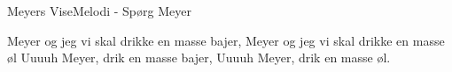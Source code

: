 \begin{sang}{Meyers Vise}{Melodi - Spørg Meyer}
\begin{vers}
Meyer og jeg vi skal drikke en masse bajer,
Meyer og jeg vi skal drikke en masse øl
Uuuuh Meyer, drik en masse bajer,
Uuuuh Meyer, drik en masse øl.
\end{vers}
\end{sang}
